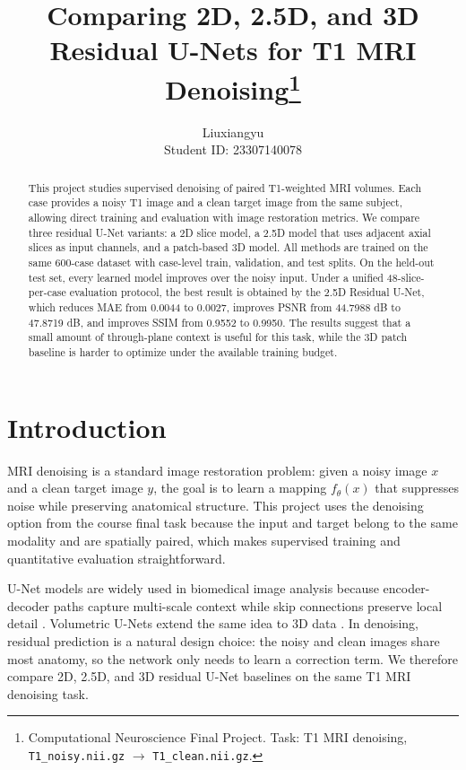 \documentclass{article}
\title{Comparing 2D, 2.5D, and 3D Residual U-Nets for T1 MRI Denoising\thanks{Computational Neuroscience Final Project. Task: T1 MRI denoising, \texttt{T1\_noisy.nii.gz} $\rightarrow$ \texttt{T1\_clean.nii.gz}.}}
\author{%
  Liuxiangyu\\
  Student ID: 23307140078
}
\begin{document}
\maketitle

\begin{abstract}
This project studies supervised denoising of paired T1-weighted MRI volumes. Each case provides a noisy T1 image and a clean target image from the same subject, allowing direct training and evaluation with image restoration metrics. We compare three residual U-Net variants: a 2D slice model, a 2.5D model that uses adjacent axial slices as input channels, and a patch-based 3D model. All methods are trained on the same 600-case dataset with case-level train, validation, and test splits. On the held-out test set, every learned model improves over the noisy input. Under a unified 48-slice-per-case evaluation protocol, the best result is obtained by the 2.5D Residual U-Net, which reduces MAE from 0.0044 to 0.0027, improves PSNR from 44.7988 dB to 47.8719 dB, and improves SSIM from 0.9552 to 0.9950. The results suggest that a small amount of through-plane context is useful for this task, while the 3D patch baseline is harder to optimize under the available training budget.
\end{abstract}

\section{Introduction}

MRI denoising is a standard image restoration problem: given a noisy image $x$ and a clean target image $y$, the goal is to learn a mapping $f_\theta(x)$ that suppresses noise while preserving anatomical structure. This project uses the denoising option from the course final task because the input and target belong to the same modality and are spatially paired, which makes supervised training and quantitative evaluation straightforward.

U-Net models are widely used in biomedical image analysis because encoder-decoder paths capture multi-scale context while skip connections preserve local detail \citep{Ronneberger2015UNet}. Volumetric U-Nets extend the same idea to 3D data \citep{Cicek20163DUNet}. In denoising, residual prediction is a natural design choice: the noisy and clean images share most anatomy, so the network only needs to learn a correction term. We therefore compare 2D, 2.5D, and 3D residual U-Net baselines on the same T1 MRI denoising task.
\end{document}
